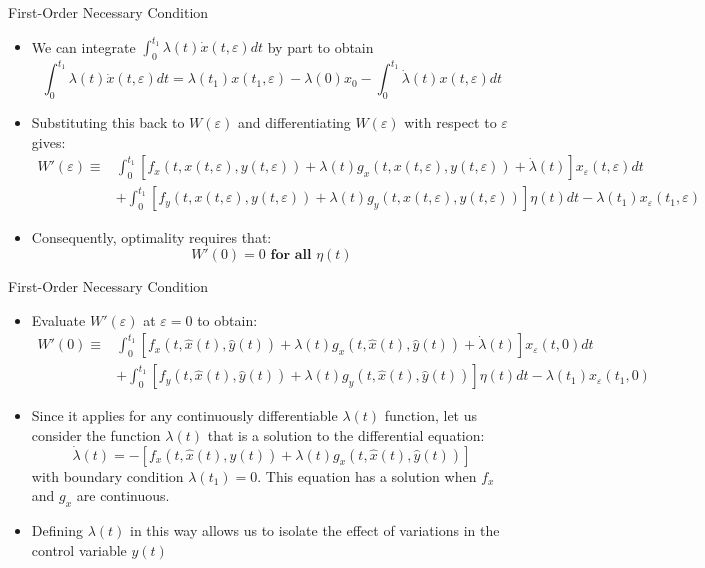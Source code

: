 \documentclass[9pt,aspectratio=169]{beamer}
\begin{document}
\begin{frame}{First-Order Necessary Condition}
    \begin{itemize}
        \item We can integrate $\int_0^{t_1}\lambda(t) \dot x(t, \varepsilon)
        dt$ by part to obtain
        \begin{equation*}
            \int_0^{t_1}\lambda(t) \dot x(t, \varepsilon) dt = \lambda(t_1)
            x(t_1, \varepsilon) - \lambda(0) x_0 - \int_0^{t_1}\dot
            \lambda(t) x(t, \varepsilon) dt
        \end{equation*}
        \item Substituting this back to $W(\varepsilon)$ and differentiating
        $W(\varepsilon)$ with respect to $\varepsilon$ gives:
    \begin{align*}
        W'(\varepsilon) \equiv &\int_0^{t_1} [f_x(t, x(t, \varepsilon), y(t,
        \varepsilon)) + \lambda(t)g_x(t, x(t, \varepsilon), y(t,
        \varepsilon)) + \dot{\lambda}(t)]x_\varepsilon(t, \varepsilon)dt\\ 
        &+\int_0^{t_1} [f_y(t, x(t, \varepsilon), y(t, \varepsilon)) +
        \lambda(t)g_y(t, x(t, \varepsilon), y(t, \varepsilon))]\eta(t)dt -
        \lambda(t_1)x_\varepsilon(t_1, \varepsilon)
    \end{align*}
    \item Consequently, optimality requires that:
    $$W'(0) = 0 \textbf{ for all } \eta(t)$$
\end{itemize}
\end{frame}

\begin{frame}{First-Order Necessary Condition}
    \begin{itemize}
        \item Evaluate $W'(\varepsilon)$ at $\varepsilon = 0$ to obtain:
        \begin{align*}
            W'(0) \equiv &\int_0^{t_1} [f_x(t, \hat{x}(t), \hat{y}(t)) +
            \lambda(t)g_x(t, \hat{x}(t), \hat{y}(t)) +
            \dot{\lambda}(t)]x_\varepsilon(t, 0)dt\\ 
            &+\int_0^{t_1} [f_y(t, \hat{x}(t), \hat{y}(t)) + \lambda(t)g_y(t,
            \hat{x}(t), \hat{y}(t))]\eta(t)dt -
            \lambda(t_1)x_\varepsilon(t_1, 0)
        \end{align*}
        \item Since it applies for any continuously differentiable
        $\lambda(t)$ function, let us consider the function $\lambda(t)$ that
        is a solution to the differential equation:
        $$\dot{\lambda}(t) = -[f_x(t, \hat{x}(t), \hat{y}(t)) + \lambda(t)g_x(t,
        \hat{x}(t), \hat{y}(t))]$$ with boundary condition $\lambda(t_1) =
        0$. This equation has a solution when $f_x$ and $g_x$ are continuous.
        \item Defining $\lambda(t)$ in this way allows us to isolate the
        effect of variations in the control variable $y(t)$
    \end{itemize}
\end{frame}
\end{document}
